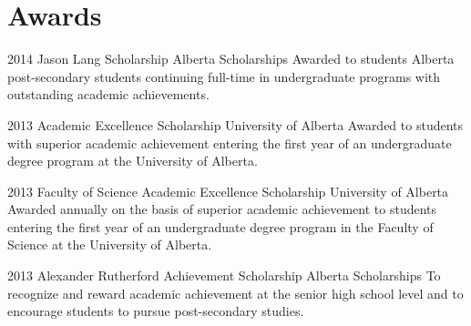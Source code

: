 \documentclass{friggeri-cv} %
\begin{document}
\pagebreak[2]
\section{Awards}

\begin{entrylist}


\entry
{2014}
{Jason Lang Scholarship}
{Alberta Scholarships}
{Awarded to students Alberta post-secondary students continuing full-time in undergraduate programs with outstanding academic achievements.}


\entry
{2013}
{Academic Excellence Scholarship}
{University of Alberta}
{Awarded to students with superior academic achievement entering the first year of an undergraduate degree program at the University of Alberta.}


\entry
{2013}
{Faculty of Science Academic Excellence Scholarship}
{University of Alberta}
{Awarded annually on the basis of superior academic achievement to students entering the first year of an undergraduate degree program in the Faculty of Science at the University of Alberta.}


\entry
{2013}
{Alexander Rutherford Achievement Scholarship}
{Alberta Scholarships}
{To recognize and reward academic achievement at the senior high school level and to encourage students to pursue post-secondary studies.}


\end{entrylist}



\end{document}
